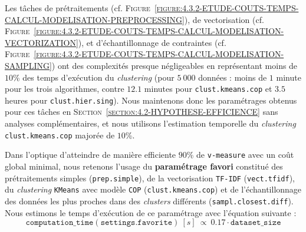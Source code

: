 			Les tâches de prétraitements (cf. \textsc{Figure~\ref{figure:4.3.2-ETUDE-COUTS-TEMPS-CALCUL-MODELISATION-PREPROCESSING}}), de vectorisation (cf. \textsc{Figure~\ref{figure:4.3.2-ETUDE-COUTS-TEMPS-CALCUL-MODELISATION-VECTORIZATION}}), et d'échantillonnage de contraintes (cf. \textsc{Figure~\ref{figure:4.3.2-ETUDE-COUTS-TEMPS-CALCUL-MODELISATION-SAMPLING}}) ont des complexités presque négligeables en représentant moins de $10$\% des temps d'exécution du \textit{clustering} (pour $5~000$ données : moins de $1$ minute pour les trois algorithmes, contre $12.1$ minutes pour \texttt{clust.kmeans.cop} et $3.5$ heures pour \texttt{clust.hier.sing}).
			Nous maintenons donc les paramétrages obtenus pour ces tâches en \textsc{Section~\ref{section:4.2-HYPOTHESE-EFFICIENCE}} sans analyses complémentaires, et nous utilisons l'estimation temporelle du \textit{clustering} \texttt{clust.kmeans.cop} majorée de $10$\%.
			
			\setcounter{localCounterOfFootnoteValue}{\value{footnote}}
			\begin{leftBarSummary}
				Dans l'optique d'atteindre de manière efficiente $90$\% de \texttt{v-measure} \footnotemark avec un coût global minimal, nous retenons l'usage du \textbf{paramétrage favori} constitué des prétraitements simples (\texttt{prep.simple}), de la vectorisation \texttt{TF-IDF} (\texttt{vect.tfidf}), du \textit{clustering} \texttt{KMeans} avec modèle \texttt{COP} (\texttt{clust.kmeans.cop}) et de l'échantillonnage des données les plus proches dans des \textit{clusters} différents (\texttt{sampl.closest.diff}).
				Nous estimons le temps d'exécution de ce paramétrage avec l'équation suivante \footnotemark :
				\begin{equation}
					\label{equation:4.3.2-ETUDE-COUTS-TEMPS-CALCUL-PARAMETRAGE-FAVORI}
					\texttt{computation\_time}(\texttt{settings.favorite})~[s]~
					\propto~0.17 \cdot \texttt{dataset\_size}
				\end{equation}
			\end{leftBarSummary}
				\footnotetext[\value{localCounterOfFootnoteValue}]{
					Temps du paramétrage favori : environ $2.8$ minutes pour $1~000$ données ; environ $14.2$ minutes pour $5~000$ données.
				}
	
